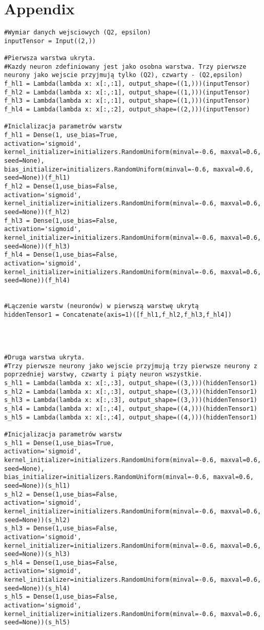 \documentclass[11pt]{book}
\theoremstyle{definition}
\begin{document}
\chapter{Appendix}
%
\begin{lstlisting}
#Wymiar danych wejsciowych (Q2, epsilon)
inputTensor = Input((2,))

#Pierwsza warstwa ukryta. 
#Kazdy neuron zdefiniowany jest jako osobna warstwa. Trzy pierwsze neurony jako wejscie przyjmują tylko (Q2), czwarty - (Q2,epsilon)
f_hl1 = Lambda(lambda x: x[:,:1], output_shape=((1,)))(inputTensor)
f_hl2 = Lambda(lambda x: x[:,:1], output_shape=((1,)))(inputTensor)
f_hl3 = Lambda(lambda x: x[:,:1], output_shape=((1,)))(inputTensor)
f_hl4 = Lambda(lambda x: x[:,:2], output_shape=((2,)))(inputTensor)

#Iniclalizacja parametrów warstw
f_hl1 = Dense(1, use_bias=True,
activation='sigmoid', 
kernel_initializer=initializers.RandomUniform(minval=-0.6, maxval=0.6, seed=None),
bias_initializer=initializers.RandomUniform(minval=-0.6, maxval=0.6, seed=None))(f_hl1)
f_hl2 = Dense(1,use_bias=False,
activation='sigmoid', 
kernel_initializer=initializers.RandomUniform(minval=-0.6, maxval=0.6, seed=None))(f_hl2)
f_hl3 = Dense(1,use_bias=False,
activation='sigmoid', 
kernel_initializer=initializers.RandomUniform(minval=-0.6, maxval=0.6, seed=None))(f_hl3)   
f_hl4 = Dense(1,use_bias=False,
activation='sigmoid', 
kernel_initializer=initializers.RandomUniform(minval=-0.6, maxval=0.6, seed=None))(f_hl4)


#Lączenie warstw (neuronów) w pierwszą warstwę ukrytą
hiddenTensor1 = Concatenate(axis=1)([f_hl1,f_hl2,f_hl3,f_hl4])




#Druga warstwa ukryta. 
#Trzy pierwsze neurony jako wejscie przyjmują trzy pierwsze neurony z poprzedniej warstwy, czwarty i piąty neuron wszystkie.
s_hl1 = Lambda(lambda x: x[:,:3], output_shape=((3,)))(hiddenTensor1)
s_hl2 = Lambda(lambda x: x[:,:3], output_shape=((3,)))(hiddenTensor1)
s_hl3 = Lambda(lambda x: x[:,:3], output_shape=((3,)))(hiddenTensor1)
s_hl4 = Lambda(lambda x: x[:,:4], output_shape=((4,)))(hiddenTensor1)
s_hl5 = Lambda(lambda x: x[:,:4], output_shape=((4,)))(hiddenTensor1)

#Inicjalizacja parametrów warstw
s_hl1 = Dense(1,use_bias=True,
activation='sigmoid', 
kernel_initializer=initializers.RandomUniform(minval=-0.6, maxval=0.6, seed=None),
bias_initializer=initializers.RandomUniform(minval=-0.6, maxval=0.6, seed=None))(s_hl1)
s_hl2 = Dense(1,use_bias=False,
activation='sigmoid', 
kernel_initializer=initializers.RandomUniform(minval=-0.6, maxval=0.6, seed=None))(s_hl2)
s_hl3 = Dense(1,use_bias=False,
activation='sigmoid', 
kernel_initializer=initializers.RandomUniform(minval=-0.6, maxval=0.6, seed=None))(s_hl3)   
s_hl4 = Dense(1,use_bias=False,
activation='sigmoid', 
kernel_initializer=initializers.RandomUniform(minval=-0.6, maxval=0.6, seed=None))(s_hl4)
s_hl5 = Dense(1,use_bias=False,
activation='sigmoid', 
kernel_initializer=initializers.RandomUniform(minval=-0.6, maxval=0.6, seed=None))(s_hl5)


\end{lstlisting}
\end{document}

